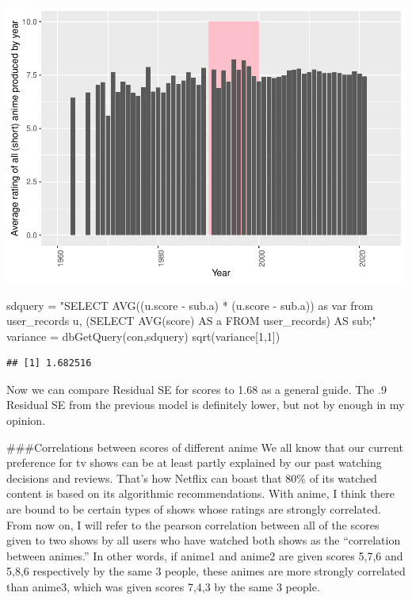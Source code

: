 \documentclass[
]{article}
\newenvironment{Shaded}{\begin{snugshade}}{\end{snugshade}}
\newcommand{\DecValTok}[1]{\textcolor[rgb]{0.00,0.00,0.81}{#1}}
\newcommand{\FunctionTok}[1]{\textcolor[rgb]{0.00,0.00,0.00}{#1}}
\newcommand{\NormalTok}[1]{#1}
\newcommand{\OtherTok}[1]{\textcolor[rgb]{0.56,0.35,0.01}{#1}}
\newcommand{\StringTok}[1]{\textcolor[rgb]{0.31,0.60,0.02}{#1}}
\begin{document}
\includegraphics{R_analysis_files/figure-latex/unnamed-chunk-18-1.pdf}

\begin{Shaded}
\begin{Highlighting}[]
\NormalTok{sdquery }\OtherTok{=} \StringTok{"SELECT AVG((u.score {-} sub.a) * (u.score {-} sub.a)) as var from user\_records u, (SELECT AVG(score) AS a FROM user\_records) AS sub;"}
\NormalTok{variance }\OtherTok{=} \FunctionTok{dbGetQuery}\NormalTok{(con,sdquery)}
\FunctionTok{sqrt}\NormalTok{(variance[}\DecValTok{1}\NormalTok{,}\DecValTok{1}\NormalTok{])}
\end{Highlighting}
\end{Shaded}

\begin{verbatim}
## [1] 1.682516
\end{verbatim}

Now we can compare Residual SE for scores to 1.68 as a general guide.
The .9 Residual SE from the previous model is definitely lower, but not
by enough in my opinion.

\#\#\#Correlations between scores of different anime We all know that
our current preference for tv shows can be at least partly explained by
our past watching decisions and reviews. That's how Netflix can boast
that 80\% of its watched content is based on its algorithmic
recommendations. With anime, I think there are bound to be certain types
of shows whose ratings are strongly correlated. From now on, I will
refer to the pearson correlation between all of the scores given to two
shows by all users who have watched both shows as the ``correlation
between animes.'' In other words, if anime1 and anime2 are given scores
5,7,6 and 5,8,6 respectively by the same 3 people, these animes are more
strongly correlated than anime3, which was given scores 7,4,3 by the
same 3 people.
\end{document}

